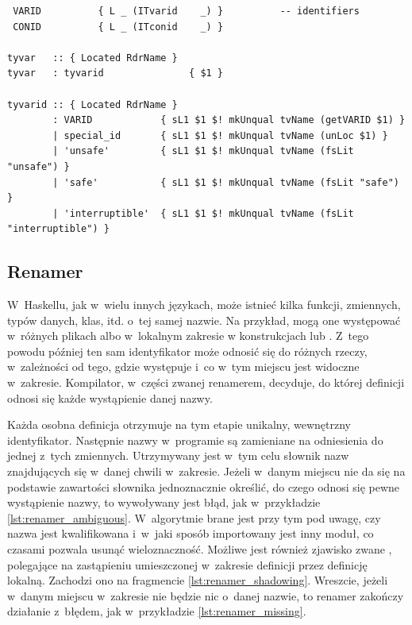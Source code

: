 \begin{lstlisting}[float,label={lst:happy_example},
                   caption={Wycinki z pliku \code{Parser.y} z produkcjami odpowiadającymi za zmienne typów, wykorzystujące tokeny, których dotyczył przykład \ref{lst:alex_example}.}]
%token
 VARID          { L _ (ITvarid    _) }          -- identifiers
 CONID          { L _ (ITconid    _) }

tyvar   :: { Located RdrName }
tyvar   : tyvarid               { $1 }

tyvarid :: { Located RdrName }
        : VARID            { sL1 $1 $! mkUnqual tvName (getVARID $1) }
        | special_id       { sL1 $1 $! mkUnqual tvName (unLoc $1) }
        | 'unsafe'         { sL1 $1 $! mkUnqual tvName (fsLit "unsafe") }
        | 'safe'           { sL1 $1 $! mkUnqual tvName (fsLit "safe") }
        | 'interruptible'  { sL1 $1 $! mkUnqual tvName (fsLit "interruptible") }
\end{lstlisting}

\subsection{Renamer}\label{sec:renamer}

W~Haskellu, jak w~wielu innych językach, może istnieć kilka funkcji, zmiennych,
typów danych, klas, itd. o~tej samej nazwie. Na przykład, mogą one występować
w~różnych plikach albo w~lokalnym zakresie w konstrukcjach  lub
. Z~tego powodu później ten sam identyfikator może odnosić się do
różnych rzeczy, w~zależności od tego, gdzie występuje i~co w~tym miejscu jest
widoczne w~zakresie. Kompilator, w~części zwanej renamerem, decyduje, do
której definicji odnosi się każde wystąpienie danej nazwy.

Każda osobna definicja otrzymuje na tym etapie unikalny, wewnętrzny identyfikator.
Następnie nazwy w~programie są zamieniane na odniesienia do jednej z~tych
zmiennych. Utrzymywany jest w~tym celu słownik nazw znajdujących się w~danej
chwili w~zakresie. Jeżeli w~danym miejscu nie da się na podstawie zawartości
słownika jednoznacznie określić, do czego odnosi się pewne wystąpienie nazwy, to
wywoływany jest błąd, jak w~przykładzie \ref{lst:renamer_ambiguous}. W~algorytmie
brane jest przy tym pod uwagę, czy nazwa jest kwalifikowana i~w~jaki sposób
importowany jest inny moduł, co czasami pozwala usunąć wieloznaczność. Możliwe jest również
zjawisko zwane , polegające na zastąpieniu umieszczonej w~zakresie
definicji przez definicję lokalną. Zachodzi ono na fragmencie
\ref{lst:renamer_shadowing}. Wreszcie, jeżeli w~danym miejscu w~zakresie nie
będzie nic o~danej nazwie, to renamer zakończy działanie z~błędem, jak
w~przykładzie \ref{lst:renamer_missing}.

